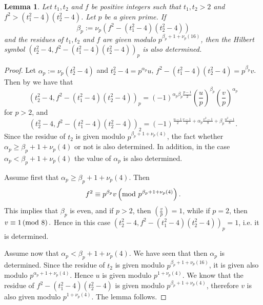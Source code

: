 \documentclass[12pt]{amsart}
\newtheorem{lemma}[theorem]{Lemma}
\theoremstyle{definition}
\numberwithin{equation}{section}
\begin{document}
\begin{lemma}\label{lem:9}Let $t_1,t_2$ and $f$ be positive integers such that $
t_1,t_2>2$
and $f^2>\left(t_1^2-4\right)\left(t_2^2-4\right)$. Let $p$ be a given prime. If
\[\beta_p:=\nu_p\left(f^2-\left(t_1^2-4\right)\left(t_2^2-4\right
)\right)\]
 and the residues of $t_1,t_2$ and $f$ are given modulo
$p^{\beta_p+1+\nu_p\left(16\right)}$, then the Hilbert symbol
$\left(t_2^2-4,f^2-\left(t_1^2-4\right)\left(t_2^2-4\right)\right
)_p$ is also determined.
\end{lemma}
\begin{proof}Let $\alpha_p:=\nu_p\left(t_2^2-4\right)$ and $t_2^2
-4=p^{\alpha_p}u$,
$f^2-\left(t_1^2-4\right)\left(t_2^2-4\right)=p^{\beta_p}v$. Then by \cite[Theorem 1 on
p 20]{Serre} we have that
\[\left(t_2^2-4,f^2-\left(t_1^2-4\right)\left(t_2^2-4\right)\right
)_p=\left(-1\right)^{\alpha_p\beta_p\frac {p-1}2}\left(\frac up\right
)^{\beta_p}\left(\frac vp\right)^{\alpha_p}\]
for $p>2$, and
\[\left(t_2^2-4,f^2-\left(t_1^2-4\right)\left(t_2^2-4\right)\right
)_2=\left(-1\right)^{\frac {u-1}2\frac {v-1}2+\alpha_p\frac {v^2-
1}8+\beta_p\frac {u^2-1}8}.\]
Since the residue of $t_2$ is given modulo $p^{\beta_p+1+\nu_p\left
(4\right)}$, the
fact whether $\alpha_p\ge\beta_p+1+\nu_p\left(4\right)$ or not is also
determined. In addition, in the case $\alpha_p<\beta_p+1+\nu_p\left
(4\right)$
the value of $\alpha_p$ is also determined.

Assume first that $\alpha_p\ge\beta_p+1+\nu_p\left(4\right)$. Then
\[f^2\equiv p^{\beta_p}v\left({\rm m}{\rm o}{\rm d}\mbox{\rm \ }p^{
\beta_p+1+\nu_p\left(4\right)}\right).\]
This implies that $\beta_p$ is even, and if $p>2$, then $\left(\frac
vp\right)=1$,
while if $p=2$, then $v\equiv 1\left({\rm m}{\rm o}{\rm d}\mbox{\rm \ }
8\right).$ Hence in this case
$\left(t_2^2-4,f^2-\left(t_1^2-4\right)\left(t_2^2-4\right)\right
)_p=1$, i.e. it is determined.

Assume now that $\alpha_p<\beta_p+1+\nu_p\left(4\right)$. We have seen that
then $\alpha_p$ is determined. Since the residue of
$t_2$ is given modulo $p^{\beta_p+1+\nu_p\left(16\right)}$, it is given also modulo
$p^{\alpha_p+1+\nu_p\left(4\right)}$. Hence $u$ is given modulo $
p^{1+\nu_p\left(4\right)}$. We
know that the residue of $f^2-\left(t_1^2-4\right)\left(t_2^2-4\right
)$ is given modulo
$p^{\beta_p+1+\nu_p\left(4\right)}$, therefore $v$ is also given modulo $
p^{1+\nu_p\left(4\right)}$.
The lemma follows.
\end{proof}
\end{document}
